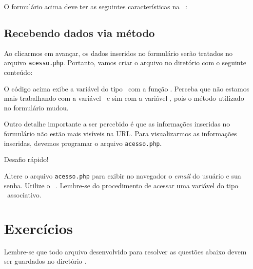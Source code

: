 O formulário acima deve ter as seguintes características na \tag~\tagform:



\subsection{Recebendo dados via método \metodoPOST}
\label{recebendo-dados-via-metodo-post}

Ao clicarmos em avançar, os dados inseridos no formulário serão tratados no arquivo
\texttt{acesso.php}. Portanto, vamos criar o arquivo no diretório 
com o seguinte conteúdo:



O código acima exibe a variável do tipo \tipoarray~com a função \funcaoprintr.
Perceba que não estamos mais trabalhando com a variável \variavelget~e sim com a
variável \variavelpost, pois o método utilizado no formulário mudou.

Outro detalhe importante a ser percebido é que as informações inseridas no
formulário não estão mais visíveis na URL. Para visualizarmos as informações
inseridas, devemos programar o arquivo \texttt{acesso.php}.

\begin{framed}
{\Large Desafio rápido!}

Altere o arquivo \texttt{acesso.php} para exibir no navegador o \textit{email} do usuário
e sua senha. Utilize o \tipoarray~\variavelpost. Lembre-se do procedimento de acessar uma 
variável do tipo \tipoarray~associativo.
\end{framed}

\section{Exercícios}
\label{cap7-exercicios}
Lembre-se que todo arquivo desenvolvido para resolver as questões abaixo devem ser
guardados no diretório .


